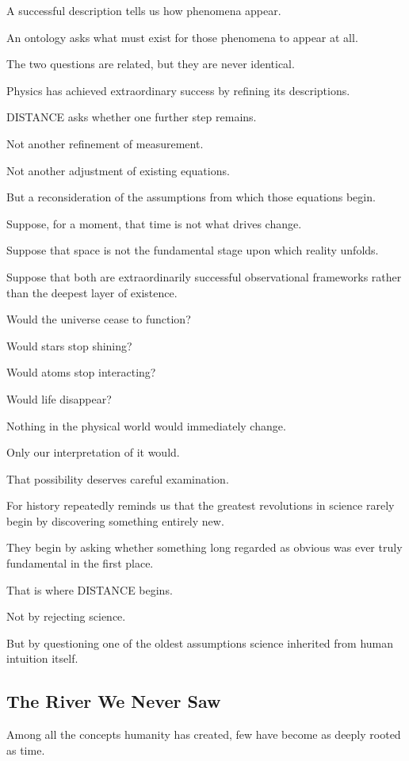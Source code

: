 A successful description tells us how phenomena appear.

An ontology asks what must exist for those phenomena to appear at all.

The two questions are related, but they are never identical.

Physics has achieved extraordinary success by refining its descriptions.

DISTANCE asks whether one further step remains.

Not another refinement of measurement.

Not another adjustment of existing equations.

But a reconsideration of the assumptions from which those equations begin.

Suppose, for a moment, that time is not what drives change.

Suppose that space is not the fundamental stage upon which reality unfolds.

Suppose that both are extraordinarily successful observational frameworks rather than the deepest layer of existence.

Would the universe cease to function?

Would stars stop shining?

Would atoms stop interacting?

Would life disappear?

Nothing in the physical world would immediately change.

Only our interpretation of it would.

That possibility deserves careful examination.

For history repeatedly reminds us that the greatest revolutions in science rarely begin by discovering something entirely new.

They begin by asking whether something long regarded as obvious was ever truly fundamental in the first place.

That is where DISTANCE begins.

Not by rejecting science.

But by questioning one of the oldest assumptions science inherited from human intuition itself.

\subsection{\textbf{The River We Never Saw}}


Among all the concepts humanity has created, few have become as deeply rooted as time.

